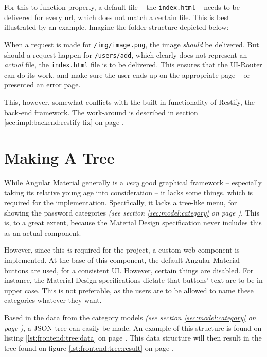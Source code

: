 		For this to function properly, a default file -- the \verb=index.html= -- needs to be delivered for every url, which does not match a certain file. This is best illustrated by an example. Imagine the folder structure depicted below:

		When a request is made for \verb=/img/image.png=, the image \emph{should} be delivered. But should a request happen for \verb=/users/add=, which clearly does not represent an \emph{actual} file, the \verb=index.html= file is to be delivered. This ensures that the UI-Router can do its work, and make sure the user ends up on the appropriate page -- or presented an error page.

		This, however, somewhat conflicts with the built-in functionality of Restify, the back-end framework. The work-around is described in section \ref{sec:impl:backend:restify-fix} on page \pageref{sec:impl:backend:restify-fix}.

	\section{Making A Tree}
		While Angular Material generally is a \emph{very} good graphical framework -- especially taking its relative young age into consideration -- it lacks some things, which is required for the implementation. Specifically, it lacks a tree-like menu, for showing the password categories \emph{(see section \ref{sec:model:category} on page \pageref{sec:model:category})}. This is, to a great extent, because the Material Design specification never includes this as an actual component. 

		However, since this \emph{is} required for the project, a custom web component is implemented. At the base of this component, the default Angular Material buttons are used, for a consistent UI. However, certain things are disabled. For instance, the Material Design specifications dictate that buttons' text are to be in upper case. This is not preferable, as the users are to be allowed to name these categories whatever they want.

		Based in the data from the category models \emph{(see section \ref{sec:model:category} on page \pageref{sec:model:category})}, a JSON tree can easily be made. An example of this structure is found on listing \ref{lst:frontend:tree:data} on page \pageref{lst:frontend:tree:data}. This data structure will then result in the tree found on figure \ref{lst:frontend:tree:result} on page \pageref{lst:frontend:tree:result}.


